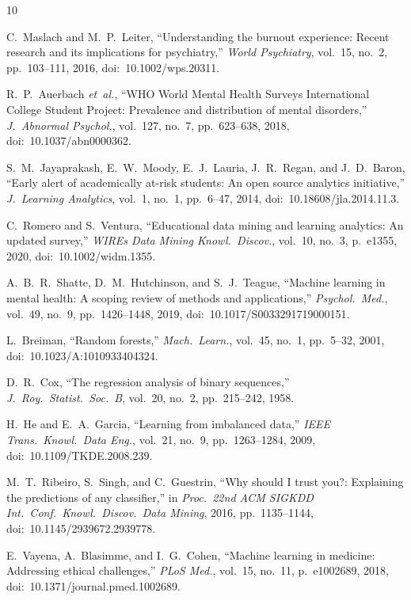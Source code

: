 \documentclass[conference]{IEEEtran}
\begin{document}
\newpage
\begin{thebibliography}{10}

C.~Maslach and M.~P.~Leiter, ``Understanding the burnout experience: Recent research and its implications for psychiatry,'' \emph{World Psychiatry}, vol.~15, no.~2, pp.~103--111, 2016, doi:~10.1002/wps.20311.

R.~P.~Auerbach \emph{et~al.}, ``WHO World Mental Health Surveys International College Student Project: Prevalence and distribution of mental disorders,'' \emph{J.\ Abnormal Psychol.}, vol.~127, no.~7, pp.~623--638, 2018, doi:~10.1037/abn0000362.

S.~M.~Jayaprakash, E.~W.~Moody, E.~J.~Lauria, J.~R.~Regan, and J.~D.~Baron, ``Early alert of academically at-risk students: An open source analytics initiative,'' \emph{J.\ Learning Analytics}, vol.~1, no.~1, pp.~6--47, 2014, doi:~10.18608/jla.2014.11.3.

C.~Romero and S.~Ventura, ``Educational data mining and learning analytics: An updated survey,'' \emph{WIREs Data Mining Knowl.\ Discov.}, vol.~10, no.~3, p.~e1355, 2020, doi:~10.1002/widm.1355.

A.~B.~R.~Shatte, D.~M.~Hutchinson, and S.~J.~Teague, ``Machine learning in mental health: A scoping review of methods and applications,'' \emph{Psychol.\ Med.}, vol.~49, no.~9, pp.~1426--1448, 2019, doi:~10.1017/S0033291719000151.

L.~Breiman, ``Random forests,'' \emph{Mach.\ Learn.}, vol.~45, no.~1, pp.~5--32, 2001, doi:~10.1023/A:1010933404324.

D.~R.~Cox, ``The regression analysis of binary sequences,'' \emph{J.\ Roy.\ Statist.\ Soc.\ B}, vol.~20, no.~2, pp.~215--242, 1958.

H.~He and E.~A.~Garcia, ``Learning from imbalanced data,'' \emph{IEEE Trans.\ Knowl.\ Data Eng.}, vol.~21, no.~9, pp.~1263--1284, 2009, doi:~10.1109/TKDE.2008.239.

M.~T.~Ribeiro, S.~Singh, and C.~Guestrin, ``Why should I trust you?: Explaining the predictions of any classifier,'' in \emph{Proc.\ 22nd ACM SIGKDD Int.\ Conf.\ Knowl.\ Discov.\ Data Mining}, 2016, pp.~1135--1144, doi:~10.1145/2939672.2939778.

E.~Vayena, A.~Blasimme, and I.~G.~Cohen, ``Machine learning in medicine: Addressing ethical challenges,'' \emph{PLoS Med.}, vol.~15, no.~11, p.~e1002689, 2018, doi:~10.1371/journal.pmed.1002689.


\end{thebibliography}
\end{document}
